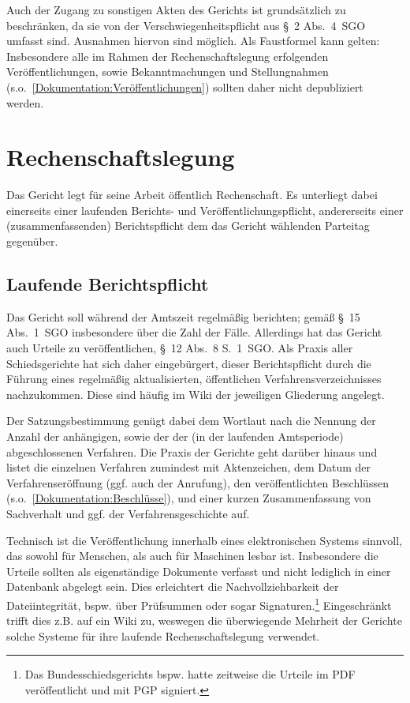 Auch der Zugang zu sonstigen Akten des Gerichts ist grundsätzlich zu beschränken, da sie von der Verschwiegenheitspflicht aus \S~2 Abs.~4~SGO umfasst sind.
Ausnahmen hiervon sind möglich.
Als Faustformel kann gelten:
Insbesondere alle im Rahmen der Rechenschaftslegung erfolgenden Veröffentlichungen, sowie Bekanntmachungen und Stellungnahmen (s.o.~\ref{Dokumentation:Veröffentlichungen}) sollten daher nicht depubliziert werden.

\section{Rechenschaftslegung}
\label{Dokumentation:Rechenschaftslegung}
Das Gericht legt für seine Arbeit öffentlich Rechenschaft.
Es unterliegt dabei einerseits einer laufenden Berichts- und Veröffentlichungspflicht, andererseits einer (zusammenfassenden) Berichtspflicht dem das Gericht wählenden Parteitag gegenüber.

\subsection{Laufende Berichtspflicht}
\label{Dokumentation:Rechenschaftslegung:Laufend}
Das Gericht soll während der Amtszeit regelmäßig berichten; gemäß \S~15 Abs.~1~SGO insbesondere über die Zahl der Fälle.
Allerdings hat das Gericht auch Urteile zu veröffentlichen, \S~12 Abs.~8 S.~1~SGO.
Als Praxis aller Schiedsgerichte hat sich daher eingebürgert, dieser Berichtspflicht durch die Führung eines regelmäßig aktualisierten, öffentlichen Verfahrensverzeichnisses nachzukommen.
Diese sind häufig im Wiki der jeweiligen Gliederung angelegt.

Der Satzungsbestimmung genügt dabei dem Wortlaut nach die Nennung der Anzahl der anhängigen, sowie der der (in der laufenden Amtsperiode) abgeschlossenen Verfahren.
Die Praxis der Gerichte geht darüber hinaus und listet die einzelnen Verfahren zumindest mit Aktenzeichen, dem Datum der Verfahrenseröffnung (ggf. auch der Anrufung), den veröffentlichten Beschlüssen (s.o.~\ref{Dokumentation:Beschlüsse}), und einer kurzen Zusammenfassung von Sachverhalt und ggf. der Verfahrensgeschichte auf.

Technisch ist die Veröffentlichung innerhalb eines elektronischen Systems sinnvoll, das sowohl für Menschen, als auch für Maschinen lesbar ist.
Insbesondere die Urteile sollten als eigenständige Dokumente verfasst und nicht lediglich in einer Datenbank abgelegt sein.
Dies erleichtert die Nachvollziehbarkeit der Dateiintegrität, bspw. über Prüfsummen oder sogar Signaturen.\footnote{Das Bundesschiedsgerichts bspw. hatte zeitweise die Urteile im PDF veröffentlicht und mit PGP signiert.}
Eingeschränkt trifft dies z.B. auf ein Wiki zu, weswegen die überwiegende Mehrheit der Gerichte solche Systeme für ihre laufende Rechenschaftslegung verwendet.

